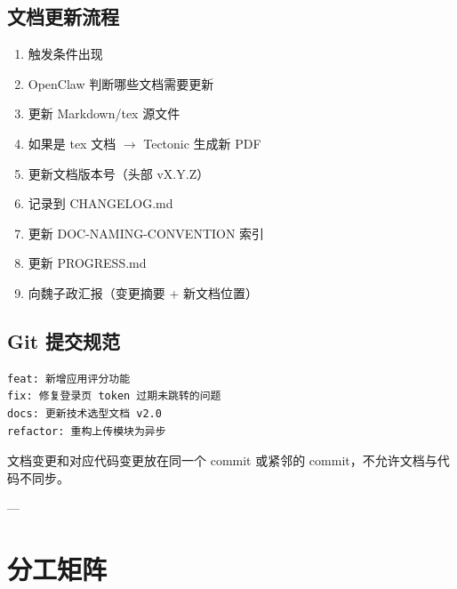 \documentclass[11pt,a4paper]{article}
\begin{document}
\subsection{文档更新流程}

\begin{enumerate}[nosep]
  \item 触发条件出现
  \item OpenClaw 判断哪些文档需要更新
  \item 更新 Markdown/tex 源文件
  \item 如果是 tex 文档 $\to$ Tectonic 生成新 PDF
  \item 更新文档版本号（头部 vX.Y.Z）
  \item 记录到 CHANGELOG.md
  \item 更新 DOC-NAMING-CONVENTION 索引
  \item 更新 PROGRESS.md
  \item 向魏子政汇报（变更摘要 + 新文档位置）
\end{enumerate}

\subsection{Git 提交规范}

\begin{verbatim}
feat: 新增应用评分功能
fix: 修复登录页 token 过期未跳转的问题
docs: 更新技术选型文档 v2.0
refactor: 重构上传模块为异步
\end{verbatim}

文档变更和对应代码变更放在同一个 commit 或紧邻的 commit，不允许文档与代码不同步。

---

\section{分工矩阵}
\end{document}
